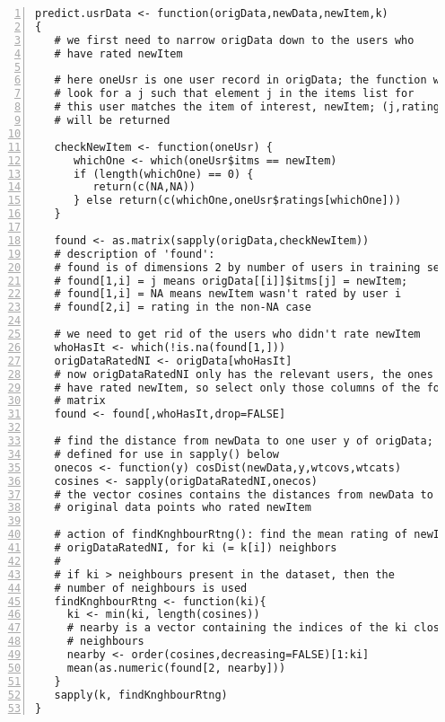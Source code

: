 \begin{lstlisting}[numbers=left]
predict.usrData <- function(origData,newData,newItem,k)
{
   # we first need to narrow origData down to the users who 
   # have rated newItem

   # here oneUsr is one user record in origData; the function will 
   # look for a j such that element j in the items list for 
   # this user matches the item of interest, newItem; (j,rating) 
   # will be returned

   checkNewItem <- function(oneUsr) {
      whichOne <- which(oneUsr$itms == newItem)
      if (length(whichOne) == 0) {
         return(c(NA,NA))
      } else return(c(whichOne,oneUsr$ratings[whichOne]))
   }

   found <- as.matrix(sapply(origData,checkNewItem))
   # description of 'found':
   # found is of dimensions 2 by number of users in training set
   # found[1,i] = j means origData[[i]]$itms[j] = newItem;
   # found[1,i] = NA means newItem wasn't rated by user i
   # found[2,i] = rating in the non-NA case

   # we need to get rid of the users who didn't rate newItem
   whoHasIt <- which(!is.na(found[1,]))
   origDataRatedNI <- origData[whoHasIt]
   # now origDataRatedNI only has the relevant users, the ones who 
   # have rated newItem, so select only those columns of the found 
   # matrix
   found <- found[,whoHasIt,drop=FALSE]

   # find the distance from newData to one user y of origData; 
   # defined for use in sapply() below
   onecos <- function(y) cosDist(newData,y,wtcovs,wtcats)
   cosines <- sapply(origDataRatedNI,onecos)
   # the vector cosines contains the distances from newData to all the
   # original data points who rated newItem

   # action of findKnghbourRtng(): find the mean rating of newItem in
   # origDataRatedNI, for ki (= k[i]) neighbors
   #
   # if ki > neighbours present in the dataset, then the 
   # number of neighbours is used
   findKnghbourRtng <- function(ki){
     ki <- min(ki, length(cosines))
     # nearby is a vector containing the indices of the ki closest 
     # neighbours
     nearby <- order(cosines,decreasing=FALSE)[1:ki]
     mean(as.numeric(found[2, nearby]))
   }
   sapply(k, findKnghbourRtng)
}
\end{lstlisting}

